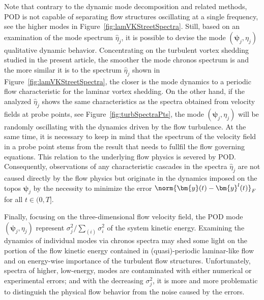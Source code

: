Note that contrary to the dynamic mode decomposition and related methods, POD is not capable of separating flow structures oscillating at a single frequency, see the higher modes in Figure~\ref{fig:lamVKStreetSpectra}. Still, based on an examination of the mode spectrum $\hat{\eta}_{j}$, it is possible to devise the mode $(\bm{\psi}_{j},\eta_{j})$ qualitative dynamic behavior. Concentrating on the turbulent vortex shedding studied in the present article, the smoother the mode chronos spectrum is and the more similar it is to the spectrum $\hat{\eta}_{j}$ shown in Figure~\ref{fig:lamVKStreetSpectra}, the closer is the mode dynamics to a periodic flow characteristic for the laminar vortex shedding. On the other hand, if the analyzed $\hat{\eta}_{j}$ shows the same characteristics as the spectra obtained from velocity fields at probe points, see Figure~\ref{fig:turbSpectraPts}, the mode $(\bm{\psi}_{j},\eta_{j})$ will be randomly oscillating with the dynamics driven by the flow turbulence. At the same time, it is necessary to keep in mind that the spectrum of the velocity field in a probe point stems from the result that needs to fullfil the flow governing equations. This relation to the underlying flow physics is severed by POD. Consequently, observations of any characteristic cascades in the spectra $\hat{\eta}_{j}$ are not caused directly by the flow physics but originate in the dynamics imposed on the topos $\bm{\psi}_{j}$ by the necessity to minimize the error $\norm{\bm{y}(t) - \bm{y}^{l}(t)}_{F}$ for all $t \in (0,T]$.

Finally, focusing on the three-dimensional flow velocity field, the POD mode $(\bm{\psi}_{j},\eta_{j})$ represent $\sigma_{j}^{2}/\sum_{(i)}\sigma_{i}^{2}$ of the system kinetic energy. Examining the dynamics of individual modes via chronos spectra may shed some light on the portion of the flow kinetic energy contained in (quasi)-periodic laminar-like flow and on energy-wise importance of the turbulent flow structures. Unfortunately, spectra of higher, low-energy, modes are contaminated with either numerical or experimental errors; and with the decreasing $\sigma_{j}^{2}$, it is more and more problematic to distinguish the physical flow behavior from the noise caused by the errors.


